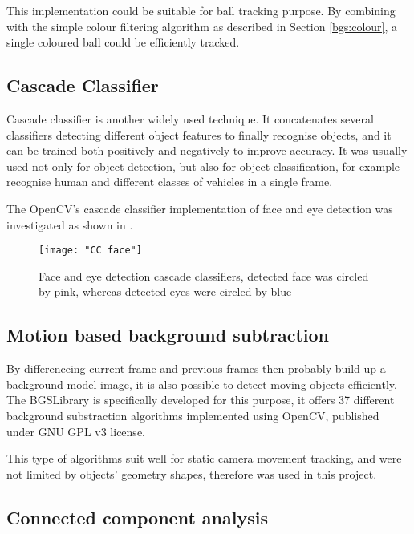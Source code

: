 This implementation could be suitable for ball tracking purpose. By combining with the simple colour filtering algorithm as described in Section \ref{bgs:colour}, a single coloured ball could be efficiently tracked.

\subsection{Cascade Classifier}

Cascade classifier \cite{cascade} is another widely used technique. It concatenates several classifiers detecting different object features to finally recognise objects, and it can be trained both positively and negatively to improve accuracy. It was usually used not only for object detection, but also for object classification, for example recognise human and different classes of vehicles in a single frame.

The OpenCV's cascade classifier implementation \cite{opencv:cc} of face and eye detection was investigated as shown in .

\begin{figure}[H]
  \centering
  \texttt{[image: "CC face"]}
  \caption{Face and eye detection cascade classifiers, detected face was circled by pink, whereas detected eyes were circled by blue}
  \label{Figure:cc_face}
\end{figure}

\subsection{Motion based background subtraction}
\label{motion_bs}

By differenceing current frame and previous frames then probably build up a background model image, it is also possible to detect moving objects efficiently. The BGSLibrary \cite{bgslibrary} is specifically developed for this purpose, it offers 37 different background substraction algorithms implemented using OpenCV, published under GNU GPL v3 license.

This type of algorithms suit well for static camera movement tracking, and were not limited by objects' geometry shapes, therefore was used in this project.

\subsection{Connected component analysis}
\label{blob}

